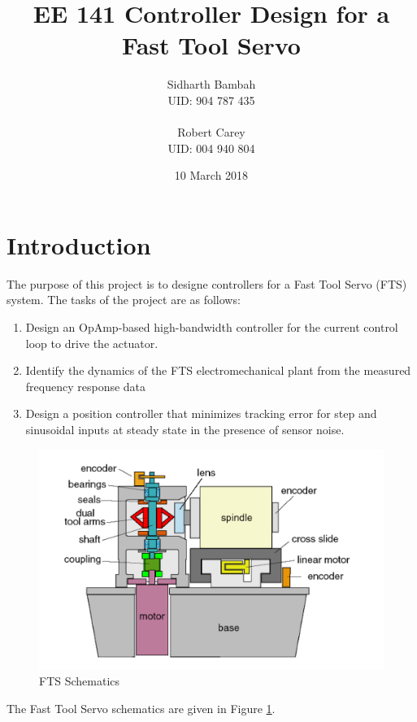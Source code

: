 \documentclass[a4paper, titlepage, 12pt]{article}
\begin{document}
	\title{EE 141 Controller Design for a Fast Tool Servo}
	\author{Sidharth Bambah \\ UID: 904 787 435 \\\\
			Robert Carey \\ UID: 004 940 804}
	\date{10 March 2018}
	\maketitle
	
	\section{Introduction}
		The purpose of this project is to designe controllers for a Fast Tool
		Servo (FTS) system. The tasks of the project are as follows: \\
		\begin{enumerate}
			\item Design an OpAmp-based high-bandwidth controller for the current
			control loop to drive the actuator.
			\item Identify the dynamics of the FTS electromechanical plant from
			the measured frequency response data
			\item Design a position controller that minimizes tracking error for
			step and sinusoidal inputs at steady state in the presence of sensor
			noise.
		\end{enumerate}
		\begin{figure}
			\centering
			\includegraphics[width=\linewidth]{images/fts_schematics.PNG}
			\caption{FTS Schematics}
			\label{fts_schematics}
		\end{figure}
		The Fast Tool Servo schematics are given in Figure \ref{fts_schematics}. \\\\
\end{document}
